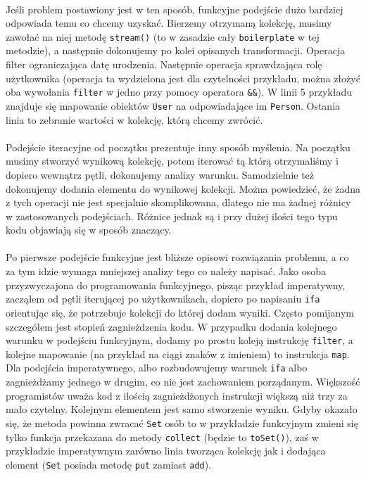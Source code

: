 \documentclass[a4paper,10pt]{report}
\begin{document}
\paragraph{}
Jeśli problem postawiony jest w ten sposób, funkcyjne podejście dużo bardziej odpowiada temu co chcemy uzyskać. Bierzemy otrzymaną kolekcję, musimy zawołać na niej metodę \verb|stream()| (to w zasadzie cały \verb|boilerplate| w tej metodzie), a następnie
dokonujemy po kolei opisanych transformacji. Operacja filter ograniczająca datę urodzenia. Następnie operacja sprawdzająca rolę użytkownika (operacja ta wydzielona jest dla czytelności przykładu, można złożyć oba wywołania \verb|filter| w jedno przy pomocy operatora
\verb|&&|). W linii 5 przykładu znajduje się mapowanie obiektów \verb|User| na odpowiadające im \verb|Person|. Ostania linia to zebranie wartości w kolekcję, którą chcemy zwrócić.
\paragraph{}
Podejście iteracyjne od początku prezentuje inny sposób myślenia. Na początku musimy stworzyć wynikową kolekcję, potem iterować tą którą otrzymaliśmy i dopiero wewnątrz pętli, dokonujemy analizy warunku. Samodzielnie też dokonujemy dodania elementu do wynikowej kolekcji. Można powiedzieć, że żadna z tych operacji nie jest specjalnie skomplikowana, dlatego nie ma żadnej różnicy w zastosowanych podejściach. Różnice jednak są i przy dużej ilości tego typu kodu objawiają się w sposób znaczący.
\paragraph{}
Po pierwsze podejście funkcyjne jest bliższe opisowi rozwiązania problemu, a co za tym idzie wymaga mniejszej analizy tego co należy napisać. Jako osoba przyzwyczajona do programowania funkcyjnego, pisząc przykład imperatywny, zacząłem od pętli iterującej po użytkownikach, dopiero po napisaniu \verb|ifa| orientując się, że potrzebuje kolekcji do której dodam wyniki. Często pomijanym szczegółem jest stopień zagnieżdzenia kodu. W przypadku dodania kolejnego warunku w podejściu funkcyjnym, dodamy po prostu koleją instrukcję \verb|filter|, a kolejne mapowanie (na przykład na ciągi znaków z imieniem) to instrukcja \verb|map|. Dla podejścia imperatywnego, albo rozbudowujemy warunek \verb|ifa| albo zagnieżdżamy jednego w drugim, co nie jest zachowaniem porządanym. Większość programistów uważa kod z ilością zagnieżdżonych instrukcji większą niż trzy za mało czytelny. Kolejnym elementem jest samo stworzenie wyniku. Gdyby okazało się, że metoda powinna zwracać \verb|Set| osób to w przykładzie funkcyjnym zmieni się tylko funkcja przekazana do metody \verb|collect| (będzie to \verb|toSet()|), zaś w przykładzie imperatywnym zarówno linia tworząca kolekcję jak i dodająca element (\verb|Set| posiada metodę \verb|put| zamiast \verb|add|).
\end{document}
